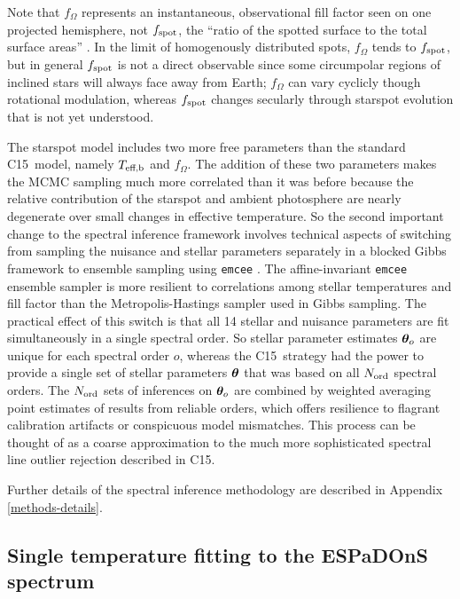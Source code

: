\documentclass[twocolumn]{emulateapj}%
\newcommand{\iancze}{{\sc C15}}
\begin{document}
Note that $f_{\Omega}$ represents an instantaneous, observational fill factor seen on one projected hemisphere, not $f_{\rm spot}$, the ``ratio of the spotted surface to the total surface areas'' \citep{somers15}.  In the limit of homogenously distributed spots, $f_{\Omega}$ tends to $f_{\rm spot}$, but in general $f_{\rm spot}$ is not a direct observable since some circumpolar regions of inclined stars will always face away from Earth; $f_{\Omega}$ can vary cyclicly though rotational modulation, whereas $f_{\rm spot}$ changes secularly through starspot evolution that is not yet understood.

The starspot model includes two more free parameters than the standard \iancze\ model, namely $T_\textrm{eff,b}$ and $f_{\Omega}$.  The addition of these two parameters makes the MCMC sampling much more correlated than it was before because the relative contribution of the starspot and ambient photosphere are nearly degenerate over small changes in effective temperature.  So the second important change to the spectral inference framework involves technical aspects of switching from sampling the nuisance and stellar parameters separately in a blocked Gibbs framework to ensemble sampling using \texttt{emcee} \citep{foreman13}.  The affine-invariant \texttt{emcee} ensemble sampler is more resilient to correlations among stellar temperatures and fill factor than the Metropolis-Hastings sampler used in Gibbs sampling.  The practical effect of this switch is that all 14 stellar and nuisance parameters are fit simultaneously in a single spectral order.  So stellar parameter estimates ${\bm \theta}_{o}$ are unique for each spectral order $o$, whereas the \iancze\ strategy had the power to provide a single set of stellar parameters ${\bm \theta}$ that was based on all $N_{\rm ord}$ spectral orders.  The $N_{\rm ord}$ sets of inferences on ${\bm \theta}_{o}$ are combined by weighted averaging point estimates of results from reliable orders, which offers resilience to flagrant calibration artifacts or conspicuous model mismatches.  This process can be thought of as a coarse approximation to the much more sophisticated spectral line outlier rejection described in \iancze.

Further details of the spectral inference methodology are described in Appendix \ref{methods-details}.


\subsection{Single temperature fitting to the ESPaDOnS spectrum}\label{sec:ESP_starfish}
\end{document}
